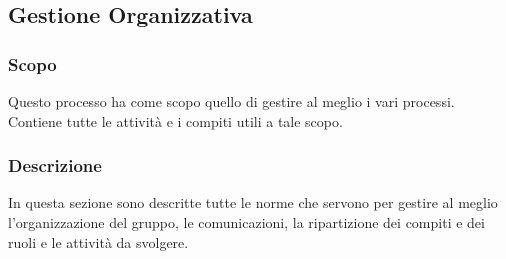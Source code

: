 \subsection{Gestione Organizzativa}
\subsubsection{Scopo}
Questo processo ha come scopo quello di gestire al meglio i vari processi. Contiene tutte le attività e i compiti utili a tale scopo.
\subsubsection{Descrizione}
In questa sezione sono descritte tutte le norme che servono per gestire al meglio l’organizzazione del gruppo, le comunicazioni, la ripartizione dei compiti e dei ruoli e le attività da svolgere.



